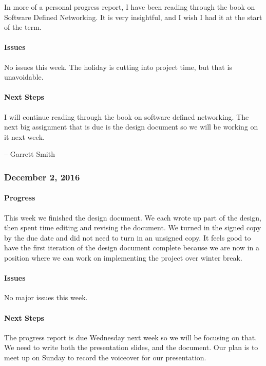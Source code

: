 \documentclass[10pt,onecolumn,journal,draftclsnofoot]{IEEEtran}
\begin{document}
In more of a personal progress report, I have been reading through the
book on Software Defined Networking. It is very insightful, and I wish I
had it at the start of the term.

\paragraph{Issues} 

No issues this week. The holiday is cutting into project time, but that
is unavoidable.

\paragraph{Next Steps} 

I will continue reading through the book on software defined networking.
The next big assignment that is due is the design document so we will be
working on it next week.

-- Garrett Smith

\subsubsection{December 2, 2016} 

\paragraph{Progress} 

This week we finished the design document. We each wrote up part of the
design, then spent time editing and revising the document. We turned in
the signed copy by the due date and did not need to turn in an unsigned
copy. It feels good to have the first iteration of the design document
complete because we are now in a position where we can work on
implementing the project over winter break.

\paragraph{Issues} 

No major issues this week.

\paragraph{Next Steps} 

The progress report is due Wednesday next week so we will be focusing on
that. We need to write both the presentation slides, and the document.
Our plan is to meet up on Sunday to record the voiceover for our
presentation.
\end{document}
